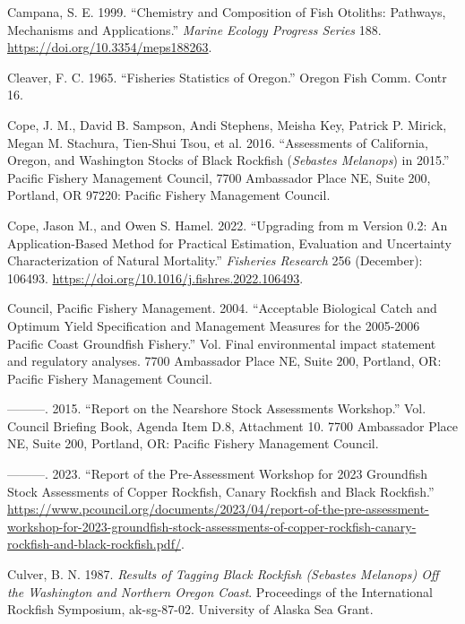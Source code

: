 \documentclass[11pt,
  english,
  letterpaper,
]{article}
\newlength{\cslhangindent}
\newenvironment{CSLReferences}[2] %
 {%
  \setlength{\parindent}{0pt}
  \ifodd #1 \everypar{\setlength{\hangindent}{\cslhangindent}}\ignorespaces\fi
  \ifnum #2 > 0
  \setlength{\parskip}{#2\baselineskip}
  \fi
 }%
 {}
\begin{document}
\begin{CSLReferences}{1}{0}
\leavevmode{}%
Campana, S. E. 1999. {``Chemistry and Composition of Fish Otoliths: Pathways, Mechanisms and Applications.''} \emph{Marine Ecology Progress Series} 188. \url{https://doi.org/10.3354/meps188263}.

\leavevmode{}%
Cleaver, F. C. 1965. {``Fisheries Statistics of Oregon.''} Oregon Fish Comm. Contr 16.

\leavevmode{}%
Cope, J. M., David B. Sampson, Andi Stephens, Meisha Key, Patrick P. Mirick, Megan M. Stachura, Tien-Shui Tsou, et al. 2016. {``Assessments of {California}, {Oregon}, and {Washington} Stocks of Black Rockfish (\emph{{Sebastes} Melanops}) in 2015.''} Pacific Fishery Management Council, 7700 Ambassador Place NE, Suite 200, Portland, OR 97220: Pacific Fishery Management Council.

\leavevmode{}%
Cope, Jason M., and Owen S. Hamel. 2022. {``Upgrading from m Version 0.2: An Application-Based Method for Practical Estimation, Evaluation and Uncertainty Characterization of Natural Mortality.''} \emph{Fisheries Research} 256 (December): 106493. \url{https://doi.org/10.1016/j.fishres.2022.106493}.

\leavevmode{}%
Council, Pacific Fishery Management. 2004. {``Acceptable Biological Catch and Optimum Yield Specification and Management Measures for the 2005-2006 Pacific Coast Groundfish Fishery.''} Vol. Final environmental impact statement and regulatory analyses. 7700 Ambassador Place NE, Suite 200, Portland, OR: Pacific Fishery Management Council.

\leavevmode{}%
---------. 2015. {``Report on the Nearshore Stock Assessments Workshop.''} Vol. Council Briefing Book, Agenda Item D.8, Attachment 10. 7700 Ambassador Place NE, Suite 200, Portland, OR: Pacific Fishery Management Council.

\leavevmode{}%
---------. 2023. {``Report of the Pre-Assessment Workshop for 2023 Groundfish Stock Assessments of Copper Rockfish, Canary Rockfish and Black Rockfish.''} \url{https://www.pcouncil.org/documents/2023/04/report-of-the-pre-assessment-workshop-for-2023-groundfish-stock-assessments-of-copper-rockfish-canary-rockfish-and-black-rockfish.pdf/}.

\leavevmode{}%
Culver, B. N. 1987. \emph{Results of Tagging Black Rockfish (Sebastes Melanops) Off the Washington and Northern Oregon Coast}. Proceedings of the International Rockfish Symposium, ak-sg-87-02. University of Alaska Sea Grant.


\end{CSLReferences}
\end{document}
